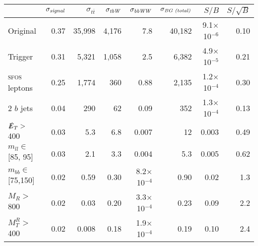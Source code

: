 \begin{tabular}{lrrrrrrr}
\toprule
{} &  $\sigma_\text{\emph{signal}}$ &  $\sigma_{t\overline{t}}$ &  $\sigma_\text{\emph{tbW}}$ &  $\sigma_\text{\emph{bbWW}}$ &  $\sigma_\text{\emph{BG (total)}}$ &   $S/B$ &  $S/\sqrt{B}$ \\
\midrule
Original            & 0.37 & 35,998 & 4,176 & 7.8     & 40,182 & 9.1$\times$ 10$^{-6}$ & 0.10 \\
Trigger             & 0.31 & 5,321  & 1,058 & 2.5     & 6,382  & 4.9$\times$ 10$^{-5}$ & 0.21 \\
\textsc{sfos} leptons        & 0.25 & 1,774  & 360   & 0.88    & 2,135  & 1.2$\times$ 10$^{-4}$ & 0.30 \\
2 $b$ jets          & 0.04 & 290    & 62    & 0.09    & 352    & 1.3$\times$ 10$^{-4}$ & 0.13 \\
$\slashed{E}_T >$ 400         & 0.03 & 5.3    & 6.8   & 0.007   & 12     & 0.003               & 0.49 \\
$m_{ll} \in$ [85, 95]  & 0.03 & 2.1    & 3.3   & 0.004   & 5.3    & 0.005               & 0.62 \\
$m_{bb}\in$ [75,150] & 0.02 & 0.59   & 0.30  & 8.2$\times$ 10$^{-4}$ & 0.90   & 0.02                & 1.3 \\
$M_{R} >$ 800       & 0.02 & 0.03   & 0.20  & 3.3$\times$ 10$^{-4}$ & 0.23   & 0.09                & 2.2 \\
$M_{T}^{R} >$ 400   & 0.02 & 0.008  & 0.18  & 1.9$\times$ 10$^{-4}$ & 0.19   & 0.10                & 2.4 \\
\bottomrule
\end{tabular}
